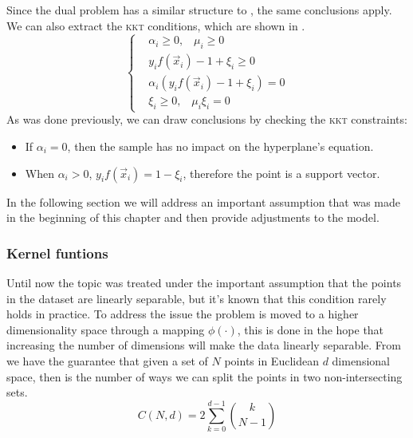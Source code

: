 Since the dual problem has a similar structure to , the same conclusions apply. We can
also extract the \textsc{kkt} conditions, which are shown in .
\begin{equation}
	\label{eq:sm-kkt}
	\begin{cases}
		 & \alpha_i \geq 0, \hspace{10pt}\mu_i \geq 0 \\
		 & y_if(\vec{x}_i) - 1 + \xi_i \geq 0         \\
		 & \alpha_i(y_if(\vec{x}_i) - 1 + \xi_i) = 0  \\
		 & \xi_i \geq 0, \hspace{10pt} \mu_i\xi_i = 0
	\end{cases}
\end{equation}
As was done previously, we can draw conclusions by checking the \textsc{kkt} constraints:
\begin{itemize}
	\item If $\alpha_i = 0$, then the sample has no impact on the hyperplane's equation.
	\item When $\alpha_i > 0$, $y_if(\vec{x}_i) = 1 - \xi_i$, therefore the point is a
		support vector.
\end{itemize}

In the following section we will address an important assumption that was made in the beginning of
this chapter and then provide adjustments to the model.

\subsubsection{Kernel funtions}
\label{sssec:kernel-functions}
Until now the topic was treated under the important assumption that the points in the dataset are
linearly separable, but it's known that this condition rarely holds in practice. To address the issue the
problem is moved to a higher dimensionality space through a mapping $\phi(\cdot)$, this is done in
the hope that increasing the number of dimensions will make the data linearly separable.
From~\cite{cover1965} we have the guarantee that given a set of $N$ points in Euclidean $d$
dimensional space, then  is the number of ways we can split the points in two
non-intersecting sets.
\begin{equation}
	\label{eq:dichotomies}
	C(N, d) = 2 \sum_{k = 0}^{d - 1}\binom{k}{N - 1}
\end{equation}

